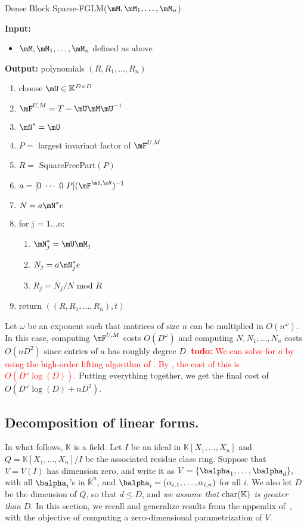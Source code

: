 \documentclass[12pt]{article}
\newcommand{\todo}[1]{\textcolor{red}{{\bf todo:} #1}}
\def\K{\mathbb{K}}
\def\K {\ensuremath{\mathbb{K}}}
\def\Kbar {{\ensuremath{\overline{\mathbb{K}}}}}
\def\D {\ensuremath{D}}
\begin{document}
\begin{algorithm}[H]
	\caption{Dense Block Sparse-FGLM($\mM,\mM_1,\dots,\mM_n$)}
	{\bf Input:} \vspace{-0.5em}
	\begin{itemize}
		\item $\mM,\mM_1,\dots,\mM_n$ defined as above
	\end{itemize}
	{\bf Output:} polynomials $(R,R_1,\dots,R_n)$
  \begin{enumerate}[{\bf 1.}]
		\item choose $\mU \in \mathbb{K}^{D\times D}$
		\item $\mF^{U,M} = T - \mU\mM\mU^{-1}$
		\item $\mN^{*} = \mU$
		\item $P =$ largest invariant factor of $\mF^{U,M}$
		\item $R =$ SquareFreePart$(P)$
		\item {\sf $a = [0 ~\cdots~ 0~ P] (\mF^{\mU,\mV})^{-1}$}
		\item {\sf $N=a\mN^*e$}
		\item {for j = $1 \dots n$:}
      \begin{enumerate}[{\bf 8.1.}]
			\item $\mN_j^* = \mU\mM_j$
			\item $N_j = a\mN_j^*e$
			\item $R_j = N_j/N$ mod $R$
		\end{enumerate}
		\item return $((R, R_1,\dots,R_n),t)$
	\end{enumerate}
	\label{algo:dense-block-sparse-fglm}
\end{algorithm}
Let $\omega$ be an exponent such that matrices of size $n$ can be multiplied
in $O(n^{\omega})$. In this case, computing $\mF^{U,M}$ costs $O(D^\omega)$
and computing $N,N_1,\dots,N_n$ costs $O(nD^2)$ since entries of $a$ has roughly degree $D$. \todo{We can solve for $a$ by
using the high-order lifting algorithm of \cite[Algorithm~5]{Stor03}. 
By \cite[Corollary~16]{Stor03}, the cost of this is $O(D^\omega \log(D))$.}
Putting everything together, we get the final cost of $O(D^\omega\log(D) + nD^2)$.

\subsection{Decomposition of linear forms.}






In what follows, $\K$ is a field.  Let $I$ be an ideal in
$\K[X_1,\dots,X_n]$ and $Q=\K[X_1,\dots,X_n]/I$ be the associated
residue class ring. Suppose that $V=V(I)$ has dimension zero, and
write it as $V=\{\balpha_1,\dots,\balpha_d\},$ with all $\balpha_i$'s
in $\Kbar^n$, and $\balpha_i=(\alpha_{i,1},\dots,\alpha_{i,n})$ for
all $i$.  We also let $\D$ be the dimension of $Q$, so that $d \le
\D$, and {\em we assume that ${\rm char}(\K)$ is greater than $D$}. In
this section, we recall and generalize results from the appendix
of~\cite{BoSaSc03}, with the objective of computing a zero-dimensional
parametrization of $V$.
\end{document}
